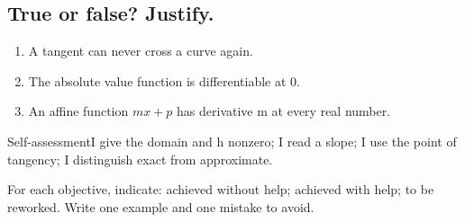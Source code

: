 \subsection*{True or false? Justify.}\label{C04-VF}
\begin{enumerate}
\item A tangent can never cross a curve again.
\item The absolute value function is differentiable at 0.
\item An affine function $mx+p$ has derivative m at every real number.
\end{enumerate}
\begin{repere}{Self-assessment}I give the domain and h nonzero; I read a slope; I use the point of tangency; I distinguish exact from approximate.

For each objective, indicate: achieved without help; achieved with help; to be reworked. Write one example and one mistake to avoid.\end{repere}
\endgroup
\ifprof\fi
